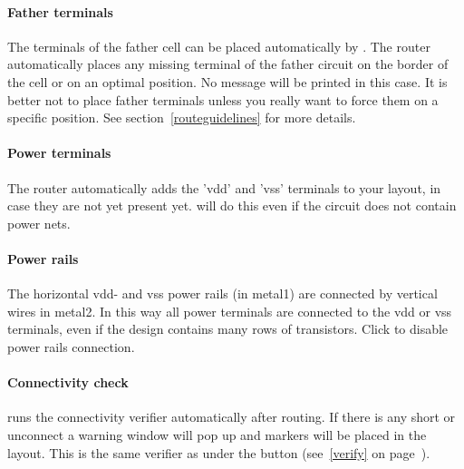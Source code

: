 \paragraph{Father terminals}
The terminals of the father cell can be placed automatically by .
The router automatically places any missing terminal of the father circuit on
the border of the cell or on an optimal position. No message will be printed in
this case. It is better not to place father terminals unless you really want to
force them on a specific position. See section~\ref{routeguidelines} for more
details.
\paragraph{Power terminals}
The router automatically adds the 'vdd' and 'vss' terminals to your layout,
in case they are not yet present yet.  will do this even
if the circuit does not contain power nets.  
\paragraph{Power rails}
The horizontal vdd- and vss power rails (in metal1) are connected by vertical
wires in metal2. In this way all power terminals are connected to the vdd or
vss terminals, even if the design contains many rows of transistors.  Click
 to disable power rails connection.
\paragraph{Connectivity check}
 runs the connectivity verifier automatically after routing. 
If there is any short or unconnect a warning window will pop up and markers
will be placed in the layout. This is the same verifier as under the button
 (see~\ref{verify} on page~\pageref{verify}).

